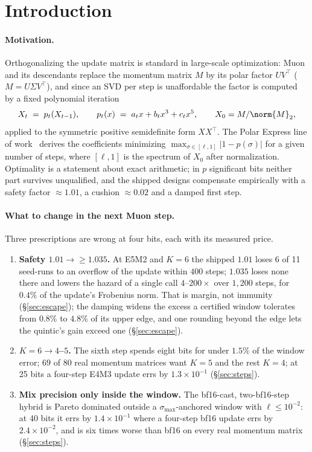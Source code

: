 \section{Introduction}

\paragraph{Motivation.}
Orthogonalizing the update matrix is standard in large-scale optimization: Muon and its
descendants replace the momentum matrix $M$ by its polar factor $UV^\top$
($M = U\Sigma V^\top$), and since an SVD per step is unaffordable the factor is computed
by a fixed polynomial iteration
\begin{equation}
X_{t} \;=\; p_t(X_{t-1}), \qquad
p_t(x) \;=\; a_t x + b_t x^3 + c_t x^5 , \qquad X_0 = M/\norm{M}_2 ,
\label{eq:iter}
\end{equation}
applied to the symmetric positive semidefinite form $XX^\top$.  The Polar Express
line of work~\cite{amsel2025polar} derives the coefficients minimizing
$\max_{\sigma\in[\ell,1]} |1 - p(\sigma)|$ for a given number of steps, where
$[\ell,1]$ is the spectrum of $X_0$ after normalization.  Optimality is a statement
about exact arithmetic; in $p$ significant bits neither part survives unqualified, and
the shipped designs compensate empirically with a safety factor $\approx1.01$, a cushion
$\approx0.02$ and a damped first step.

\paragraph{What to change in the next Muon step.}
Three prescriptions are wrong at four bits, each with its measured price.
\begin{enumerate}
\item \textbf{Safety $1.01 \to \ge 1.035$.}  At E5M2 and $K=6$ the shipped $1.01$
  loses 6 of 11 seed-runs to an overflow of the update within $400$ steps; $1.035$ loses
  none there and lowers the hazard of a single call $4$--$200\times$ over $1{,}200$ steps,
  for $0.4\%$ of the update's Frobenius norm.  That is margin, not immunity (\S\ref{sec:escape});
  the damping widens the excess a certified
  window tolerates from $0.8\%$ to $4.8\%$ of its upper edge, and one rounding beyond the
  edge lets the quintic's gain exceed one (\S\ref{sec:escape}).
\item \textbf{$K=6 \to 4$--$5$.}  The sixth step spends eight bits for under $1.5\%$ of
  the window error; $69$ of $80$ real momentum matrices want $K=5$ and the rest $K=4$;
  at 25 bits a four-step E4M3 update errs by $1.3\times10^{-1}$
  (\S\ref{sec:steps}).
\item \textbf{Mix precision only inside the window.}  The bf16-cast, two-bf16-step
  hybrid is Pareto dominated outside a $\sigma_{\max}$-anchored window with
  $\ell\le10^{-2}$: at 40 bits it errs by $1.4\times10^{-1}$ where a four-step bf16
  update errs by $2.4\times10^{-2}$, and is six times worse than bf16 on every real
  momentum matrix (\S\ref{sec:steps}).
\end{enumerate}

